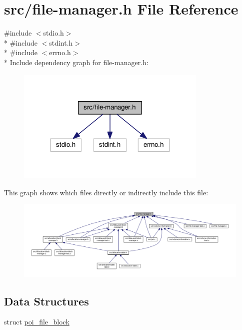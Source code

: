 \hypertarget{file-manager_8h}{\section{src/file-\/manager.h File Reference}
\label{file-manager_8h}
}
{\ttfamily \#include $<$stdio.\-h$>$}\\*
{\ttfamily \#include $<$stdint.\-h$>$}\\*
{\ttfamily \#include $<$errno.\-h$>$}\\*
Include dependency graph for file-\/manager.h\-:
\nopagebreak
\begin{figure}[H]
\begin{center}
\leavevmode
\includegraphics[width=258pt]{file-manager_8h__incl}
\end{center}
\end{figure}
This graph shows which files directly or indirectly include this file\-:
\nopagebreak
\begin{figure}[H]
\begin{center}
\leavevmode
\includegraphics[width=350pt]{file-manager_8h__dep__incl}
\end{center}
\end{figure}
\subsection*{Data Structures}
\begin{DoxyCompactItemize}
\item 
struct \hyperlink{structpoi__file__block}{poi\-\_\-file\-\_\-block}
\end{DoxyCompactItemize}
